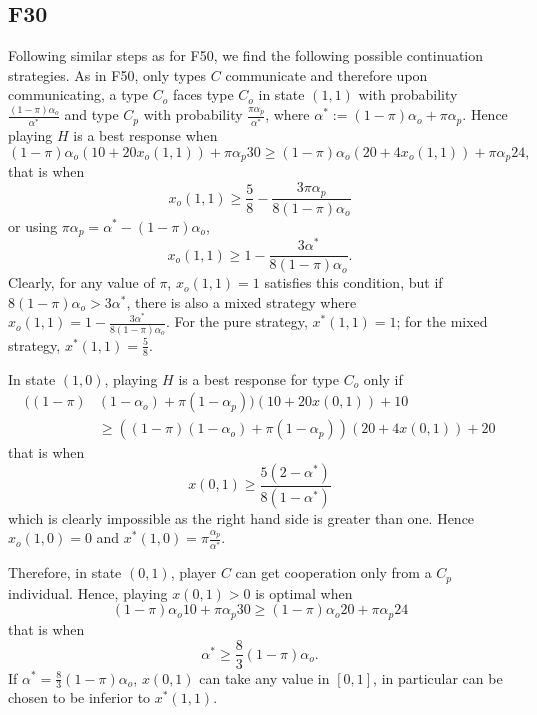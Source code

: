 \documentclass[12pt]{article}
\begin{document}
\subsection{F30}
Following similar steps as for F50, we find the following possible continuation strategies.  As in F50, only types $C$ communicate and therefore upon communicating, a type $C_o$ faces type $C_o$ in state $(1,1)$ with probability $\frac{(1-\pi)\alpha_o}{\alpha^*}$ and type $C_p$ with probability $\frac{\pi\alpha_p}{\alpha^*}$, where $\alpha^*:=(1-\pi)\alpha_o+\pi\alpha_p$. Hence  playing $H$ is a best response when
\[
(1-\pi)\alpha_o (10+20x_o(1,1))+\pi\alpha_p 30\geq (1-\pi)\alpha_o (20+4x_o(1,1))+\pi\alpha_p 24,
\]
that is when
\[
x_o(1,1)\geq \frac{5}{8}-\frac{3\pi\alpha_p}{8(1-\pi)\alpha_o}
	\]
	or using $\pi\alpha_p=\alpha^*-(1-\pi)\alpha_o$,
	\begin{equation}\label{f30:11}
		x_o(1,1)\geq 1-\frac{3\alpha^*}{8(1-\pi)\alpha_o}.
	\end{equation}
Clearly, for any value of $\pi$, $x_o(1,1)=1$ satisfies this condition, but if $8(1-\pi)\alpha_o>3\alpha^*$, there is also a mixed strategy where $x_o(1,1)= 1-\frac{3\alpha^*}{8(1-\pi)\alpha_o}$. For the pure strategy, $x^*(1,1)=1$; for the mixed strategy, $x^*(1,1)=\frac{5}{8}$.


In state $(1,0)$, playing $H$ is a best response for type $C_o$ only if
\begin{equation*}
	\begin{split}
	((1-\pi)&(1-\alpha_o)+\pi(1-\alpha_p))(10+20x(0,1))+10\\ 
	&\geq ((1-\pi)(1-\alpha_o)+\pi(1-\alpha_p))(20+4x(0,1))+20		
\end{split}
\end{equation*}
that is when
\[
x(0,1)\geq \frac{5(2-\alpha^*)}{8(1-\alpha^*)}
\]
 which is clearly impossible as the right hand side is greater than one. Hence $x_o(1,0)=0$ and $x^*(1,0)=\pi\frac{\alpha_p}{\alpha^*}$.

 Therefore, in state $(0,1)$, player $C$ can get cooperation only from a $C_p$ individual. Hence, playing $x(0,1)>0$ is optimal when
 \[
(1-\pi)\alpha_o 10+\pi\alpha_p 30\geq (1-\pi)\alpha_o 20+\pi\alpha_p 24
 \]
 that is when
 \begin{equation}\label{f30:01}
	\alpha^*\geq \frac{8}{3}(1-\pi)\alpha_o.
 \end{equation}
If $\alpha^*= \frac{8}{3}(1-\pi)\alpha_o$, $x(0,1)$ can take any value in $[0,1]$, in particular can be chosen to be inferior to $x^*(1,1)$.
\end{document}
